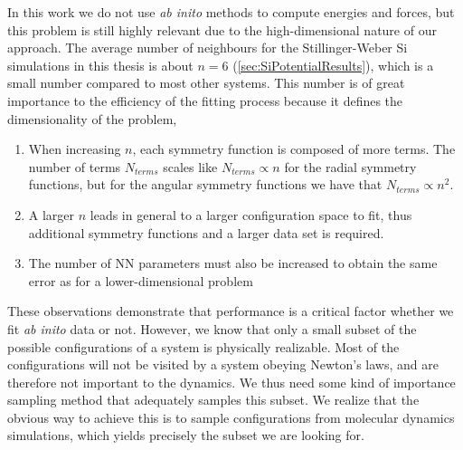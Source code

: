 \documentclass[twoside,english]{uiofysmaster}
\begin{document}
In this work we do not use \textit{ab inito} methods to compute energies and forces, but this problem is still highly relevant
due to the high-dimensional nature of our approach. The average number of neighbours for the Stillinger-Weber Si simulations
in this thesis is about $n=6$ (\autoref{sec:SiPotentialResults}), which is a small number compared to most other systems.  
This number is of great importance to the efficiency of the fitting process because it defines the dimensionality 
of the problem,
\begin{enumerate}
 \item When increasing $n$, each symmetry function is composed of 
 more terms. The number of terms $N_{terms}$ scales like $N_{terms} \propto n$ for the radial symmetry functions, 
 but for the angular symmetry functions we have that $N_{terms} \propto n^2$. 
 \item A larger $n$ leads in general to a larger configuration space to fit, thus additional symmetry functions and 
 a larger data set is required. 
 \item The number of NN parameters must also be increased to obtain the same error as for a lower-dimensional problem
\end{enumerate}
These observations demonstrate that performance is a critical factor whether we fit \textit{ab inito} data or 
not. However, we know that only a small subset of the possible configurations of a system is physically realizable. 
Most of the configurations will not be visited by a system obeying Newton's laws, and are therefore not important to
the dynamics. We thus need some kind of importance sampling method that adequately samples this subset. 
We realize that the obvious way to achieve this is to sample configurations from molecular dynamics simulations, which
yields precisely the subset we are looking for. 
\end{document}
